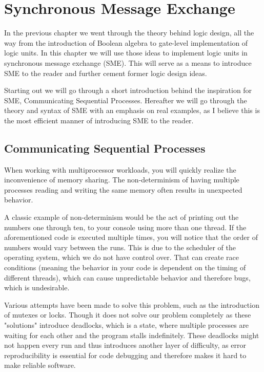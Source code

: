 \chapter{Synchronous Message Exchange}

In the previous chapter we went through the theory behind logic design, all the way from the introduction of Boolean algebra to gate-level implementation of logic units. In this chapter we will use those ideas to implement logic units in synchronous message exchange (SME). This will serve as a means to introduce SME to the reader and further cement former logic design ideas.

Starting out we will go through a short introduction behind the inspiration for SME, Communicating Sequential Processes. Hereafter we will go through the theory and syntax of SME with an emphasis on real examples, as I believe this is the most efficient manner of introducing SME to the reader.  

\section{Communicating Sequential Processes}
    
    When working with multiprocessor workloads, you will quickly realize the inconvenience of memory sharing. The non-determinism of having multiple processes reading and writing the same memory often results in unexpected behavior.
    
    A classic example of non-determinism would be the act of printing out the numbers one through ten, to your console using more than one thread. If the aforementioned code is executed multiple times, you will notice that the order of numbers would vary between the runs. This is due to the scheduler of the operating system, which we do not have control over. That can create race conditions (meaning the behavior in your code is dependent on the timing of different threads), which can cause unpredictable behavior and therefore bugs, which is undesirable.
    
    Various attempts have been made to solve this problem, such as the introduction of mutexes or locks. Though it does not solve our problem completely as these "solutions" introduce deadlocks, which is a state, where multiple processes are waiting for each other and the program stalls indefinitely. These deadlocks might not happen every run and thus introduces another layer of difficulty, as error reproducibility is essential for code debugging and therefore makes it hard to make reliable software.
    
